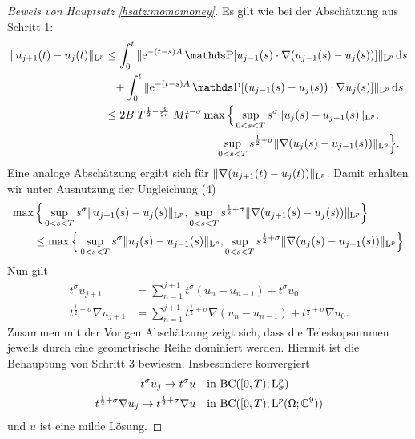 \begin{proof}[Beweis von Hauptsatz \ref{hsatz:momomoney}]
  Es gilt wie bei der Abschätzung aus Schritt 1:
  \begin{align*}
    \|u_{j + 1}(t) - u_j(t)\|_{\Ell^p}
    &\leq \int_0^t \|\e^{-(t - s) A} \PP[ u_{j - 1}(s) \cdot \nabla (u_{j - 1}(s) - u_j(s))] \|_{\Ell^p} \d s \\
    &\hphantom{\leq} + \int_0^t \|\e^{-(t - s)A} \PP[ (u_{j - 1}(s) - u_j(s)) \cdot \nabla u_j(s) ] \|_{\Ell^p} \d s \\
    &\leq 2B \; T^{\frac{1}{2} - \frac{3}{2r}} \;M t^{-\sigma} \max\Big\{ \sup_{0 < s < T} s^\sigma \|u_j(s) - u_{j - 1}(s) \|_{\Ell^p},\\
    &\hphantom{2B M\; T^{\frac{1}{2} - \frac{3}{2r}} t^{-\sigma} \max\Big\{ }
    \sup_{0 < s < T} s^{\frac{1}{2} + \sigma} \|\nabla(u_j(s) - u_{j - 1}(s)) \|_{\Ell^p} \Big\}.
  \end{align*}
  Eine analoge Abschätzung ergibt sich für $\|\nabla(u_{j + 1}(t) - u_j(t)) \|_{\mathrm{L}^p}$.
  Damit erhalten wir unter Ausnutzung der Ungleichung (4)
  \begin{align*}
    &\max\Big\{\sup_{0 < s < T} s^\sigma \| u_{j + 1}(s) - u_j(s) \|_{\mathrm{L}^p}, \sup_{0 < s < T} s^{\frac{1}{2} + \sigma} \|\nabla(u_{j + 1}(s) - u_j(s)) \|_{\mathrm{L}^p} \Big\} \\
    &\qquad\leq
    \max\Big\{\sup_{0 < s < T} s^\sigma \| u_{j}(s) - u_{j - 1}(s) \|_{\mathrm{L}^p}, \sup_{0 < s < T} s^{\frac{1}{2} + \sigma} \|\nabla(u_{j}(s) - u_{j - 1}(s)) \|_{\mathrm{L}^p} \Big\}.
  \end{align*}
  Nun gilt 
  \begin{align*}
    t^\sigma u_{j + 1} &= \sum_{n = 1}^{j + 1} t^\sigma (u_n - u_{n - 1}) + t^\sigma u_0 \\
    t^{\frac{1}{2} + \sigma} \nabla u_{j + 1} &= \sum_{n = 1}^{j + 1} t^{\frac{1}{2} + \sigma} \nabla (u_n - u_{n - 1}) + t^{\frac{1}{2} + \sigma} \nabla u_0.
  \end{align*}
  Zusammen mit der Vorigen Abschätzung zeigt sich, dass die Teleskopsummen jeweils durch eine geometrische Reihe dominiert werden.
  Hiermit ist die Behauptung von Schritt 3 bewiesen.
  Insbesondere konvergiert
  \begin{align*}
    t^\sigma u_j \to t^\sigma u &\quad\text{in } \mathrm{BC}([0,T); \mathrm{L}^p_\sigma) \\
      t^{\frac{1}{2} + \sigma} \nabla u_j \to t^{\frac{1}{2} + \sigma} \nabla u &\quad\text{in } \mathrm{BC}([0,T); \mathrm{L}^p(\Omega; \mathbb{C}^9))
  \end{align*}
  und $u$ ist eine milde Lösung.


\end{proof}
